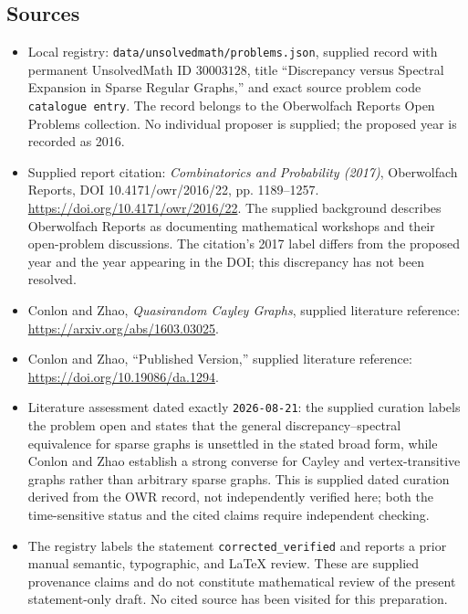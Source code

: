 \documentclass[11pt]{article}
\begin{document}
\subsection{Sources}
\begin{itemize}
\item Local registry: \texttt{data/unsolvedmath/problems.json}, supplied record with permanent UnsolvedMath ID \(30003128\), title ``Discrepancy versus Spectral Expansion in Sparse Regular Graphs,'' and exact source problem code \texttt{catalogue entry}. The record belongs to the Oberwolfach Reports Open Problems collection. No individual proposer is supplied; the proposed year is recorded as 2016.
\item Supplied report citation: \emph{Combinatorics and Probability (2017)}, Oberwolfach Reports, DOI 10.4171/owr/2016/22, pp. 1189--1257. \url{https://doi.org/10.4171/owr/2016/22}. The supplied background describes Oberwolfach Reports as documenting mathematical workshops and their open-problem discussions. The citation's 2017 label differs from the proposed year and the year appearing in the DOI; this discrepancy has not been resolved.
\item Conlon and Zhao, \emph{Quasirandom Cayley Graphs}, supplied literature reference: \url{https://arxiv.org/abs/1603.03025}.
\item Conlon and Zhao, ``Published Version,'' supplied literature reference: \url{https://doi.org/10.19086/da.1294}.
\item Literature assessment dated exactly \texttt{2026-08-21}: the supplied curation labels the problem open and states that the general discrepancy--spectral equivalence for sparse graphs is unsettled in the stated broad form, while Conlon and Zhao establish a strong converse for Cayley and vertex-transitive graphs rather than arbitrary sparse graphs. This is supplied dated curation derived from the OWR record, not independently verified here; both the time-sensitive status and the cited claims require independent checking.
\item The registry labels the statement \texttt{corrected\_verified} and reports a prior manual semantic, typographic, and LaTeX review. These are supplied provenance claims and do not constitute mathematical review of the present statement-only draft. No cited source has been visited for this preparation.
\end{itemize}
\end{document}
